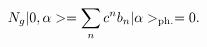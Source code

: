 \begin{equation}
N_g  | 0, \alpha > = \sum_n  c^{n} b_{n}  | \alpha >_{{\rm ph.}} = 0. \label{eq:bkirksekiz}
\end{equation}

